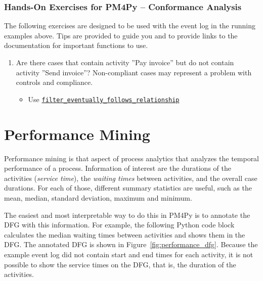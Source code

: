 \begin{tcolorbox}[colback=code]
\subsubsection*{Hands-On Exercises for PM4Py -- Conformance Analysis}

The following exercises are designed to be used with the event log in the running examples above. Tips are provided to guide you and to provide links to the documentation for important functions to use.

\begin{enumerate}
   \item Are there cases that contain activity ''Pay invoice'' but do not contain activity ''Send invoice''? Non-compliant cases may represent a problem with controls and compliance.
   \begin{itemize}
      \item Use \href{https://processintelligence.solutions/static/api/2.7.11/generated/pm4py.filtering.filter_eventually_follows_relation.html}{\texttt{filter\_eventually\_follows\_relationship}}
   \end{itemize}
\end{enumerate}
\end{tcolorbox}

\section{Performance Mining}

Performance mining is that aspect of process analytics that analyzes the temporal performance of a process. Information of interest are the durations of the activities (\emph{service time}), the \emph{waiting times} between activities, and the overall case durations. For each of those, different summary statistics are useful, such as the mean, median, standard deviation, maximum and minimum. 

The easiest and most interpretable way to do this in PM4Py is to annotate the DFG with this information. For example, the following Python code block calculates the median waiting times between activities and shows them in the DFG. The annotated DFG is shown in Figure~\ref{fig:performance_dfg}. Because the example event log did not contain start and end times for each activity, it is not possible to show the service times on the DFG, that is, the duration of the activities.


